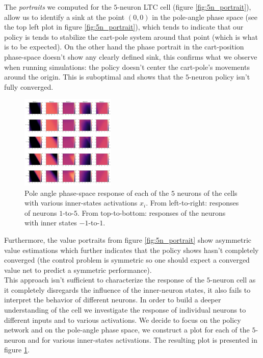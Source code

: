 The \textit{portraits} we computed for the $5$-neuron LTC cell (figure \ref{fig:5n_portrait}), allow us to identify a sink at the point $(0,0)$ in the pole-angle phase space (see the top left plot in figure \ref{fig:5n_portrait}), which tends to indicate that our policy is tends to stabilize the cart-pole system around that point (which is what is to be expected). On the other hand the phase portrait in the cart-position phase-space doesn't show any clearly defined sink, this confirms what we observe when running simulations: the policy doesn't center the cart-pole's movements around the origin. This is suboptimal and shows that the $5$-neuron policy isn't fully converged. \\

\begin{figure}[h!]
    \centering
    \includegraphics[width=0.4\textwidth]{figures/5n_pnr.pdf}
    \caption{Pole angle phase-space response of each of the $5$ neurons of the cells with various inner-states activations $x_i$. From left-to-right: responses of neurons $1$-to-$5$. From top-to-bottom: responses of the neurons with inner states $-1$-to-$1$.}
    \label{fig:5n_invidual_responses}
\end{figure}

Furthermore, the value portraits from figure \ref{fig:5n_portrait} show asymmetric value estimations which further indicates that the policy shows hasn't completely converged (the control problem is symmetric so one should expect a converged value net to predict a symmetric performance). \\

This approach isn't sufficient to characterize the response of the $5$-neuron cell as it completely disregards the influence of the inner-neuron states, it also fails to interpret the behavior of different neurons. In order to build a deeper understanding of the cell we investigate the response of individual neurons to different inputs and to various activations. We decide to focus on the policy network and on the pole-angle phase space, we construct a plot for each of the $5$-neuron and for various inner-states activations. The resulting plot is presented in figure \ref{fig:5n_invidual_responses}. \\

